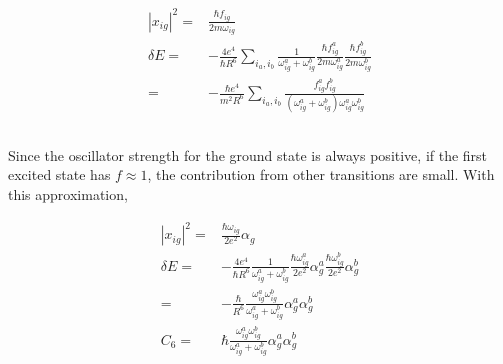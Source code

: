 \documentclass[10pt,fleqn]{article}
\newcommand{\eqar}[1]
{
  \begin{align*}
    #1
  \end{align*}
}
\newcommand{\paren}[1]{{\left({#1}\right)}}
\newcommand{\abs}[1]{{\left|{#1}\right|}}
\begin{document}
\subsection{}
\eqar{
  \abs{x_{ig}}^2=&\frac{\hbar f_{ig}}{2m\omega_{ig}}\\
  \delta E=&-\frac{4e^4}{\hbar R^6}\sum_{i_a, i_b}\frac{1}{\omega^a_{ig}+\omega^b_{ig}}\frac{\hbar f^a_{ig}}{2m\omega^a_{ig}}\frac{\hbar f^b_{ig}}{2m\omega^b_{ig}}\\
  =&-\frac{\hbar e^4}{m^2R^6}\sum_{i_a, i_b}\frac{f^a_{ig}f^b_{ig}}{\paren{\omega^a_{ig}+\omega^b_{ig}}\omega^a_{ig}\omega^b_{ig}}
}
\subsection{}
Since the oscillator strength for the ground state is always positive, if the first excited state has $f\approx1$, the contribution from other transitions are small. With this approximation,
\eqar{
  \abs{x_{ig}}^2=&\frac{\hbar\omega_{ig}}{2e^2}\alpha_g\\
  \delta E=&-\frac{4e^4}{\hbar R^6}\frac{1}{\omega^a_{ig}+\omega^b_{ig}}\frac{\hbar\omega^a_{ig}}{2e^2}\alpha^a_g\frac{\hbar\omega^b_{ig}}{2e^2}\alpha^b_g\\
  =&-\frac{\hbar}{R^6}\frac{\omega^a_{ig}\omega^b_{ig}}{\omega^a_{ig}+\omega^b_{ig}}\alpha^a_g\alpha^b_g\\
  C_6=&\hbar\frac{\omega^a_{ig}\omega^b_{ig}}{\omega^a_{ig}+\omega^b_{ig}}\alpha^a_g\alpha^b_g
}
\end{document}

